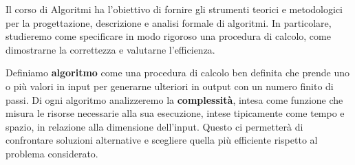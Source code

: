 Il corso di Algoritmi ha l’obiettivo di fornire gli strumenti teorici e metodologici per la progettazione, descrizione e analisi formale di algoritmi. In particolare, studieremo come specificare in modo rigoroso una procedura di calcolo, come dimostrarne la correttezza e valutarne l’efficienza.\par
Definiamo \textbf{algoritmo} come una procedura di calcolo ben definita che prende uno o più valori in input per generarne ulteriori in output con un numero finito di passi. Di ogni algoritmo analizzeremo la \textbf{complessità}, intesa come funzione che misura le risorse necessarie alla sua esecuzione, intese tipicamente come tempo e spazio, in relazione alla dimensione dell’input. Questo ci permetterà di confrontare soluzioni alternative e scegliere quella più efficiente rispetto al problema considerato.

%

